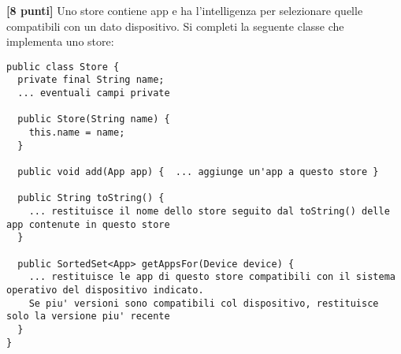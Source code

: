 \documentclass{article}[10pt]
\newcounter{esnu}
\newenvironment{esercizio}{\medskip \noindent {\bf Esercizio\addtocounter{esnu}{1} \arabic{esnu}}}{}
\begin{document}
\begin{esercizio}
\textbf{[8 punti]}
Uno store contiene app e ha l'intelligenza per selezionare quelle compatibili con un dato dispositivo.
Si completi la seguente classe che implementa uno store:
%
{\small
\begin{verbatim}
public class Store {
  private final String name;
  ... eventuali campi private

  public Store(String name) {
    this.name = name;
  }

  public void add(App app) {  ... aggiunge un'app a questo store }

  public String toString() {
    ... restituisce il nome dello store seguito dal toString() delle app contenute in questo store
  }

  public SortedSet<App> getAppsFor(Device device) {
    ... restituisce le app di questo store compatibili con il sistema operativo del dispositivo indicato. 
    Se piu' versioni sono compatibili col dispositivo, restituisce solo la versione piu' recente
  }
}
\end{verbatim}}

\end{esercizio}
\end{document}
